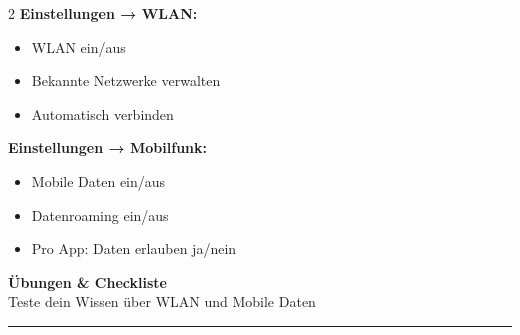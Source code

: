 \documentclass[a4paper,landscape,8pt]{extarticle}
\begin{document}
\begin{multicols}{2}
\textbf{Einstellungen → WLAN:}
\begin{itemize}
\item WLAN ein/aus
\item Bekannte Netzwerke verwalten
\item \glqq Automatisch verbinden\grqq{}
\end{itemize}

\textbf{Einstellungen → Mobilfunk:}
\begin{itemize}
\item Mobile Daten ein/aus
\item Datenroaming ein/aus
\item Pro App: Daten erlauben ja/nein
\end{itemize}

\vspace{2mm}

\begin{center}
\end{center}

\end{multicols}

\newpage


\begin{center}
{\LARGE\bfseries Übungen \& Checkliste}\\[3pt]
{\normalsize Teste dein Wissen über WLAN und Mobile Daten}
\end{center}

\vspace{1mm}
\hrule
\vspace{2mm}
\end{document}
